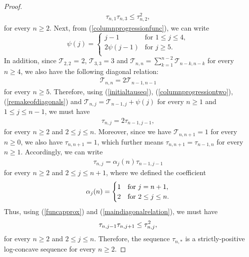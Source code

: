 \documentclass[10pt,a4paper]{amsart}
\def\T{\mathcal{T}}
\begin{document}
\begin{proof}
\begin{align}
\label{funcapprox}
\tau_{n,1}\tau_{n,3} \leq \tau_{n,2}^2,
\end{align}
for every $n\geq 2$. Next, from (\ref{columnprogressionfunc}), we can write
\begin{equation}
\label{columnprogressiontwo}
\psi(j) =
\begin{cases}
j -1 & \text{for $1 \leq j \leq 4$},\\
2\psi(j-1) &  \text{for $j \geq 5$}. \\
\end{cases}
\end{equation}
In addition, since $\T_{2,2}$ = 2, $\T_{3,3} = 3$ and $\T_{n,n} = \sum_{k=1}^{n-2} \T_{n-k,n-k}$ for every $n \geq 4$, we also have the following diagonal relation:
\begin{align}
\T_{n,n} = 2\T_{n-1,n-1} \label{remakeofdiagonals}
\end{align}
for every $ n \geq 5$. Therefore, using (\ref{initialtauseq}), (\ref{columnprogressiontwo}), (\ref{remakeofdiagonals}) and $\T_{n,j} = \T_{n-1,j} + \psi(j)$ for every $n \geq 1$ and $1 \leq j \leq n-1$, we must have
\begin{align}
\tau_{n,j} = 2 \tau_{n-1,j-1}, \label{maindiagonalrelationfirsteq}
\end{align}
for every $n \geq 2$ and $2 \leq j \leq n$. Moreover, since we have $\T_{n,n+1} = 1$ for every $n \geq 0$, we also have $\tau_{n,n+1} = 1$, which further means $\tau_{n,n+1} = \tau_{n-1,n}$ for every $n \geq 1$. Accordingly, we can write
\begin{align}
\label{maindiagonalrelation}
\tau_{n,j} = \alpha_j(n) \tau_{n-1,j-1}
\end{align}
for every $n \geq 2$ and $2 \leq j \leq n+1$, where we defined the coefficient
\begin{equation}
\alpha_j(n) =
\begin{cases}
1 & \text{for $j = n+1$},\\
2 &  \text{for $2 \leq j \leq n$}. \notag
\end{cases}
\end{equation}
Thus, using (\ref{funcapprox}) and (\ref{maindiagonalrelation}), we must have 
\begin{align}
\tau_{n,j-1}\tau_{n,j+1} \leq \tau_{n,j}^2, \notag 
\end{align}
for every $n\geq 2$ and $2 \leq j \leq n$. Therefore, the sequence $\tau_{n,*}$ is a strictly-positive log-concave sequence for every $n\geq 2$.
\end{proof}
\end{document}

